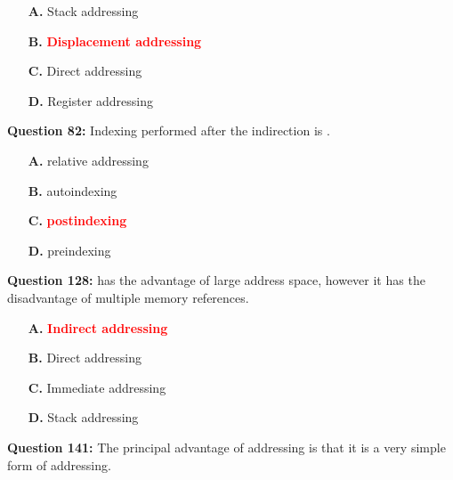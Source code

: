 \documentclass[12pt,a4paper]{article}
\begin{document}
\begin{itemize}
    \item[\textbf{A.}] Stack addressing
    \item[\textbf{B.}] \textcolor{red}{\textbf{Displacement addressing}}
    \item[\textbf{C.}] Direct addressing
    \item[\textbf{D.}] Register addressing
\end{itemize}

\vspace{0.5cm}

\vspace{0.5cm}

\textbf{Question 82:} Indexing performed after the indirection is \underline{\hspace{1.5cm}} .

\begin{itemize}
    \item[\textbf{A.}] relative addressing
    \item[\textbf{B.}] autoindexing
    \item[\textbf{C.}] \textcolor{red}{\textbf{postindexing}}
    \item[\textbf{D.}] preindexing
\end{itemize}

\vspace{0.5cm}

\vspace{0.5cm}

\textbf{Question 128:} \underline{\hspace{1.5cm}} has the advantage of large address space, however it has the disadvantage of multiple memory references.

\begin{itemize}
    \item[\textbf{A.}] \textcolor{red}{\textbf{Indirect addressing}}
    \item[\textbf{B.}] Direct addressing
    \item[\textbf{C.}] Immediate addressing
    \item[\textbf{D.}] Stack addressing
\end{itemize}

\vspace{0.5cm}

\vspace{0.5cm}

\textbf{Question 141:} The principal advantage of \underline{\hspace{1.5cm}} addressing is that it is a very simple form of addressing.
\end{document}
